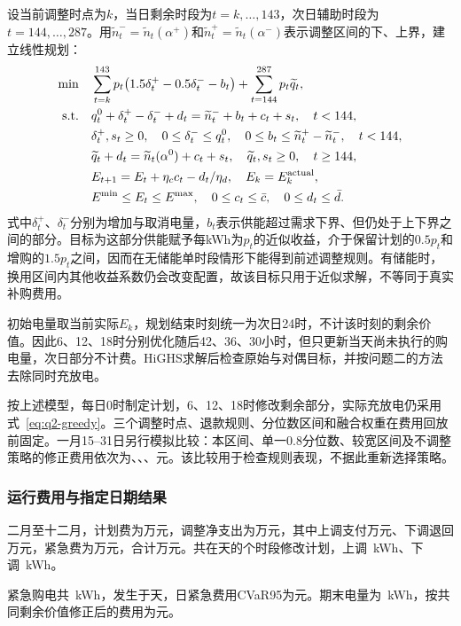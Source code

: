 设当前调整时点为$k$，当日剩余时段为$t=k,\dots,143$，次日辅助时段为$t=144,\dots,287$。用$\widetilde n_t^{-}=\widetilde n_t(\alpha^{+})$和$\widetilde n_t^{+}=\widetilde n_t(\alpha^{-})$表示调整区间的下、上界，建立线性规划：
\begin{equation}
\begin{aligned}
 \min\quad&\sum_{t=k}^{143}p_t\bigl(1.5\delta_t^+-0.5\delta_t^--b_t\bigr)+\sum_{t=144}^{287}p_t\widetilde q_t,\\
 \text{s.t.}\quad&q_t^0+\delta_t^+-\delta_t^-+d_t=\widetilde n_t^{-}+b_t+c_t+s_t,\quad t<144,\\
 &\delta_t^+,s_t\ge0,\quad 0\le \delta_t^-\le q_t^0,\quad 0\le b_t\le\widetilde n_t^{+}-\widetilde n_t^{-},\quad t<144,\\
 &\widetilde q_t+d_t=\widetilde n_t(\alpha^0)+c_t+s_t,\quad \widetilde q_t,s_t\ge0,\quad t\ge144,\\
 &E_{t+1}=E_t+\eta_cc_t-d_t/\eta_d,\quad E_k=E_k^{\rm actual},\\
 &E^{\min}\le E_t\le E^{\max},\quad 0\le c_t\le\bar c,\quad 0\le d_t\le\bar d.
\end{aligned}
\label{eq:q3-adjust}
\end{equation}
式中$\delta_t^+$、$\delta_t^-$分别为增加与取消电量，$b_t$表示供能超过需求下界、但仍处于上下界之间的部分。目标为这部分供能赋予每kWh为$p_t$的近似收益，介于保留计划的$0.5p_t$和增购的$1.5p_t$之间，因而在无储能单时段情形下能得到前述调整规则。有储能时，换用区间内其他收益系数仍会改变配置，故该目标只用于近似求解，不等同于真实补购费用。

初始电量取当前实际$E_k$，规划结束时刻统一为次日24时，不计该时刻的剩余价值。因此6、12、18时分别优化随后42、36、30小时，但只更新当天尚未执行的购电量，次日部分不计费。HiGHS求解后检查原始与对偶目标，并按问题二的方法去除同时充放电。

按上述模型，每日0时制定计划，6、12、18时修改剩余部分，实际充放电仍采用式~\eqref{eq:q2-greedy}。三个调整时点、退款规则、分位数区间和融合权重在费用回放前固定。一月15--31日另行模拟比较：本区间、单一0.8分位数、较宽区间及不调整策略的修正费用依次为\QThreeCheckBand、\QThreeCheckSymmetric、\QThreeCheckWide、\QThreeCheckPlanOnly 元。该比较用于检查规则表现，不据此重新选择策略。

\subsubsection{运行费用与指定日期结果}

二月至十二月，计划费为\QThreePlanCost 万元，调整净支出为\QThreeAdjustCost 万元，其中上调支付\QThreeUpCost 万元、下调退回\QThreeDownCost 万元，紧急费为\QThreeEmergencyCost 万元，合计\QThreeTotalCost 万元。共在\QThreeAdjustedDays 天的\QThreeAdjustedSlots 个时段修改计划，上调\QThreeUpEnergy\ kWh、下调\QThreeDownEnergy\ kWh。\par 紧急购电共\QThreeEmergencyEnergy\ kWh，发生于\QThreeEmergencyDays 天，日紧急费用CVaR95为\QThreeCvar 元。期末电量为\QThreeTerminal\ kWh，按共同剩余价值修正后的费用为\QThreeAdjusted 元。

